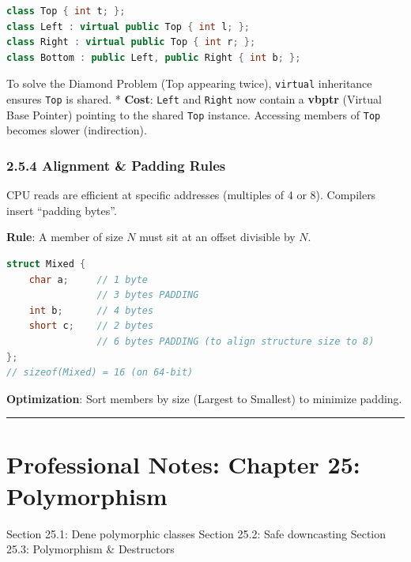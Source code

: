 \begin{lstlisting}[language={C++}]
class Top { int t; };
class Left : virtual public Top { int l; };
class Right : virtual public Top { int r; };
class Bottom : public Left, public Right { int b; };
\end{lstlisting}

To solve the Diamond Problem (Top appearing twice),
\passthrough{\lstinline!virtual!} inheritance ensures
\passthrough{\lstinline!Top!} is shared. * \textbf{Cost}:
\passthrough{\lstinline!Left!} and \passthrough{\lstinline!Right!} now
contain a \textbf{vbptr} (Virtual Base Pointer) pointing to the shared
\passthrough{\lstinline!Top!} instance. Accessing members of
\passthrough{\lstinline!Top!} becomes slower (indirection).

\hypertarget{alignment-padding-rules}{%
\subsection{2.5.4 Alignment \& Padding
Rules}\label{alignment-padding-rules}}

CPU reads are efficient at specific addresses (multiples of 4 or 8).
Compilers insert ``padding bytes''.

\textbf{Rule}: A member of size \(N\) must sit at an offset divisible by
\(N\).

\begin{lstlisting}[language={C++}]
struct Mixed {
    char a;     // 1 byte
                // 3 bytes PADDING
    int b;      // 4 bytes
    short c;    // 2 bytes
                // 6 bytes PADDING (to align structure size to 8)
};
// sizeof(Mixed) = 16 (on 64-bit)
\end{lstlisting}

\textbf{Optimization}: Sort members by size (Largest to Smallest) to
minimize padding.

\begin{center}\rule{0.5\linewidth}{0.5pt}\end{center}

\hypertarget{professional-notes-chapter-25-polymorphism}{%
\chapter{Professional Notes: Chapter 25:
Polymorphism}\label{professional-notes-chapter-25-polymorphism}}

Section 25.1: Dene polymorphic classes Section 25.2: Safe downcasting
Section 25.3: Polymorphism \& Destructors

